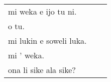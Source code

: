 \begin{supertabular}{p{5,5cm}|ll}
mi weka e ijo tu ni. &&   \\ %
o tu.  &&  \\ %
mi lukin e soweli luka. && \\   %
mi ' weka.  &&  \\ %
ona li sike ala sike? && \\ %
\end{supertabular}
